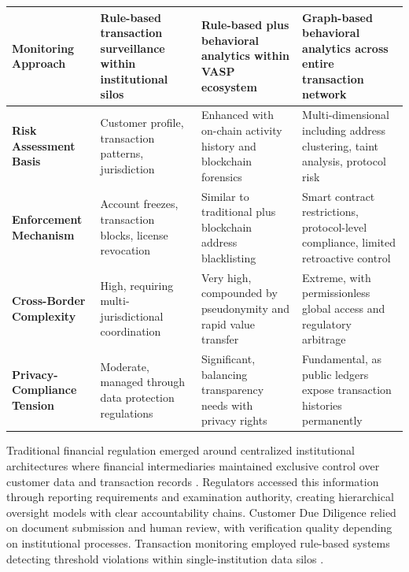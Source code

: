 \begin{table}[t]
\begin{tabularx}{\textwidth}{lXXX}
\midrule
\textbf{Monitoring Approach} & Rule-based transaction surveillance within institutional silos \cite{drezewski2015applicationsocialnetwork} & Rule-based plus behavioral analytics within VASP ecosystem \cite{weber2019antimoneylaunderingbitcoin} & Graph-based behavioral analytics across entire transaction network \cite{wu2023tracerscalablegraphbased,azad2025machinelearningblockchain} \\
\midrule
\textbf{Risk Assessment Basis} & Customer profile, transaction patterns, jurisdiction \cite{financialactiontaskforcefatf2012internationalstandardscombating} & Enhanced with on-chain activity history and blockchain forensics \cite{moser2014riskscoringbitcoin} & Multi-dimensional including address clustering, taint analysis, protocol risk \cite{moser2013inquirymoneylaundering,difrancescomaesa2018datadrivenanalysisbitcoin} \\
\midrule
\textbf{Enforcement Mechanism} & Account freezes, transaction blocks, license revocation \cite{financialactiontaskforcefatf2012internationalstandardscombating} & Similar to traditional plus blockchain address blacklisting \cite{force2021updatedguidanceriskbased} & Smart contract restrictions, protocol-level compliance, limited retroactive control \cite{szabo1997formalizingsecuringrelationships,luu2016makingsmartcontracts} \\
\midrule
\textbf{Cross-Border Complexity} & High, requiring multi-jurisdictional coordination \cite{financialactiontaskforcefatf2012internationalstandardscombating} & Very high, compounded by pseudonymity and rapid value transfer \cite{force2021opportunitieschallengesnew,salami2021challengesapproachesregulating} & Extreme, with permissionless global access and regulatory arbitrage \cite{bonneau2015sokresearchperspectives,werbach2018trustverifywhy} \\
\midrule
\textbf{Privacy-Compliance Tension} & Moderate, managed through data protection regulations \cite{zetsche2017fintechtechfinregulatory} & Significant, balancing transparency needs with privacy rights \cite{pocher2022privacytransparencycbdcs} & Fundamental, as public ledgers expose transaction histories permanently \cite{androulaki2013evaluatinguserprivacy,koshy2014analysisanonymitybitcoin} \\
\bottomrule
\end{tabularx}
\end{table}

Traditional financial regulation emerged around centralized institutional architectures where financial intermediaries maintained exclusive control over customer data and transaction records \cite{arner2016fintechregtechreconceptualization,zetsche2017fintechtechfinregulatory}. Regulators accessed this information through reporting requirements and examination authority, creating hierarchical oversight models with clear accountability chains. Customer Due Diligence relied on document submission and human review, with verification quality depending on institutional processes. Transaction monitoring employed rule-based systems detecting threshold violations within single-institution data silos \cite{drezewski2015applicationsocialnetwork}.

